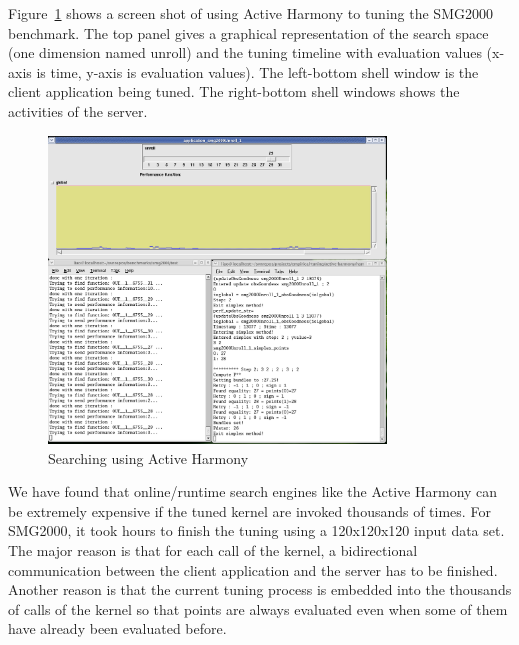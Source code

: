 Figure~\ref{fig:activeHarmony2} shows a screen shot of using Active Harmony to tuning the SMG2000 benchmark. 
The top panel gives a graphical representation of the search space (one dimension named unroll) and the tuning timeline with evaluation values (x-axis is time, y-axis is evaluation values). 
The left-bottom shell window is the client application being tuned. 
The right-bottom shell windows shows the activities of the server.
\begin{figure}[tbp]
        \centering
                \includegraphics[width=0.8\textwidth]{activeHarmony2.png}
        \caption{Searching using Active Harmony}
        \label{fig:activeHarmony2}
\end{figure}

We have found that online/runtime search engines like the Active Harmony can be extremely expensive if the tuned kernel are invoked thousands of times. 
For SMG2000, it took hours to finish the tuning using a 120x120x120 input data set.
The major reason is that for each call of the kernel, a bidirectional communication between the client application and the server has to be finished. 
Another reason is that the current tuning process is embedded into the thousands of calls of the kernel so that points are always evaluated even when some of them have already been evaluated before. 


